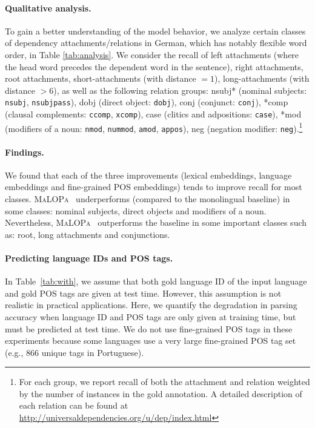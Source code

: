 \documentclass[11pt]{article}
\newcommand{\malopa}{\textsc{MaLOPa}}
\begin{document}
\paragraph{Qualitative analysis.}
To gain a better understanding of the model behavior, we analyze certain classes of dependency attachments/relations in German, which has notably flexible word order, in Table \ref{tab:analysis}.
We consider the recall of left attachments (where the head word precedes the dependent word in the sentence), right attachments, root attachments, short-attachments (with distance $=1$), long-attachments (with distance $>6$), as well as the following relation groups: nsubj* (nominal subjects: \texttt{nsubj}, \texttt{nsubjpass}), dobj (direct object: \texttt{dobj}), conj (conjunct: \texttt{conj}), *comp (clausal complements: \texttt{ccomp}, \texttt{xcomp}), case (clitics and adpositions: \texttt{case}), *mod (modifiers of a noun: \texttt{nmod}, \texttt{nummod}, \texttt{amod}, \texttt{appos}), neg (negation modifier: \texttt{neg}).\footnote{For each group, we report recall of both the attachment and relation weighted by the number of instances in the gold annotation. A detailed description of each relation can be found at \url{http://universaldependencies.org/u/dep/index.html}}

\paragraph{Findings.} 
We found that each of the three improvements (lexical embeddings, language embeddings and fine-grained POS embeddings) tends to improve recall for most classes.
\malopa~ underperforms (compared to the monolingual baseline) in some classes: nominal subjects, direct objects and modifiers of a noun.
Nevertheless, \malopa~ outperforms the baseline in some important classes such as: root, long attachments and conjunctions.

\paragraph{Predicting language IDs and POS tags.}
In Table~\ref{tab:with}, we assume that both gold language ID of the input language and gold POS tags are given at test time.
However, this assumption is not realistic in practical applications.
Here, we quantify the degradation in parsing accuracy when language ID and POS tags are only given at training time, but must be predicted at test time. 
We do not use fine-grained POS tags in these experiments because some languages use a very large fine-grained POS tag set (e.g., 866 unique tags in Portuguese).
\end{document}
